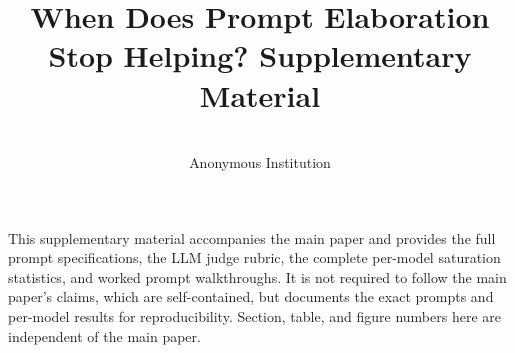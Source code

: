 \documentclass[wcp]{jmlr}
\title[Prompt Elaboration: Supplementary Material]{When Does Prompt Elaboration
       Stop Helping? Supplementary Material}
\author{\Name{Anonymous Author(s)} \Email{anonymous@example.com}\\
\addr Anonymous Institution}
\begin{document}
\makeatletter
\let \@jmlrpages \@empty
\makeatother

\maketitle

\noindent
This supplementary material accompanies the main paper and provides the full
prompt specifications, the LLM judge rubric, the complete per-model saturation
statistics, and worked prompt walkthroughs. It is not required to follow the
main paper's claims, which are self-contained, but documents the exact prompts
and per-model results for reproducibility. Section, table, and figure numbers
here are independent of the main paper.

\appendix

\end{document}
